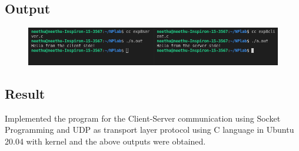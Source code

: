 \subsection{Output}
\begin{figure}[h]
            \centering
            \includegraphics[scale=0.57]{img/e8.png}
\end{figure}

\subsection{Result}
Implemented the program for the Client-Server communication using Socket Programming and UDP as transport layer protocol using C language in Ubuntu 20.04 with kernel and the above outputs were obtained.

